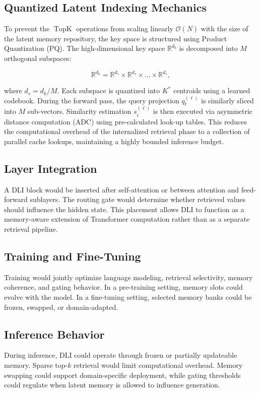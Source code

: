 \subsection{Quantized Latent Indexing Mechanics}
To prevent the $\operatorname{TopK}$ operations from scaling linearly $\mathcal{O}(N)$ with the size of the latent memory repository, the key space is structured using Product Quantization (PQ). The high-dimensional key space $\mathbb{R}^{d_k}$ is decomposed into $M$ orthogonal subspaces:

\begin{equation}
\mathbb{R}^{d_k} = \mathbb{R}^{d_s} \times \mathbb{R}^{d_s} \times \dots \times \mathbb{R}^{d_s},
\end{equation}

where $d_s = d_k / M$. Each subspace is quantized into $K^*$ centroids using a learned codebook. During the forward pass, the query projection $q_t^{(\ell)}$ is similarly sliced into $M$ sub-vectors. Similarity estimation $s_i^{(\ell)}$ is then executed via asymmetric distance computation (ADC) using pre-calculated look-up tables. This reduces the computational overhead of the internalized retrieval phase to a collection of parallel cache lookups, maintaining a highly bounded inference budget.

\subsection{Layer Integration}
A DLI block would be inserted after self-attention or between attention and feed-forward sublayers. The routing gate would determine whether retrieved values should influence the hidden state. This placement allows DLI to function as a memory-aware extension of Transformer computation rather than as a separate retrieval pipeline.

\subsection{Training and Fine-Tuning}
Training would jointly optimize language modeling, retrieval selectivity, memory coherence, and gating behavior. In a pre-training setting, memory slots could evolve with the model. In a fine-tuning setting, selected memory banks could be frozen, swapped, or domain-adapted.

\subsection{Inference Behavior}
During inference, DLI could operate through frozen or partially updateable memory. Sparse top-$k$ retrieval would limit computational overhead. Memory swapping could support domain-specific deployment, while gating thresholds could regulate when latent memory is allowed to influence generation.

